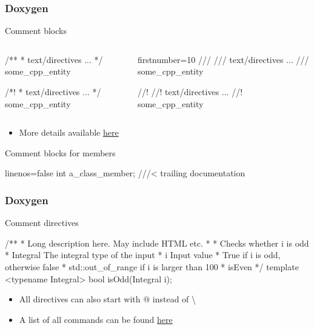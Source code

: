 \begin{frame}[fragile]
  \frametitle{Doxygen}
  \begin{block}{Comment blocks}
    \begin{columns}
      \begin{column}{.35\textwidth}
        \begin{cppcode*}{}
          /**
           * text/directives ...
           */
          some_cpp_entity

          /*!
           * text/directives ...
           */
          some_cpp_entity
        \end{cppcode*}
      \end{column}
      \begin{column}{.35\textwidth}
        \begin{cppcode*}{firstnumber=10}
          ///
          /// text/directives ...
          ///
          some_cpp_entity

          //!
          //! text/directives ...
          //!
          some_cpp_entity
        \end{cppcode*}
      \end{column}
    \end{columns}
    \begin{itemize}
      \item More details available \href{https://www.doxygen.nl/manual/docblocks.html}{here}
    \end{itemize}
  \end{block}
  \begin{block}{Comment blocks for members}
    \begin{cppcode*}{linenos=false}
      int a_class_member; ///< trailing documentation
    \end{cppcode*}
  \end{block}

\end{frame}

\begin{frame}[fragile]
  \frametitle{Doxygen}
  \begin{block}{Comment directives}
    \begin{cppcode*}{}
      /**
       * Long description here. May include HTML etc.
       *
       * \brief Checks whether i is odd
       * \tparam Integral The integral type of the input
       * \param i Input value
       * \return True if i is odd, otherwise false
       * \throw std::out_of_range if i is larger than 100
       * \see isEven
       */
      template <typename Integral>
      bool isOdd(Integral i);
    \end{cppcode*}
    \begin{itemize}
      \item All directives can also start with @ instead of \textbackslash
      \item A list of all commands can be found \href{https://doxygen.nl/manual/commands.html}{here}
    \end{itemize}
  \end{block}
\end{frame}
